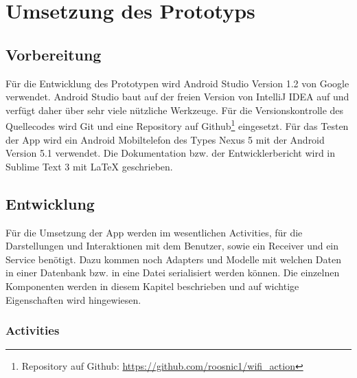 \chapter{Umsetzung des Prototyps}
\label{sec:umsetzung}

\section{Vorbereitung}

Für die Entwicklung des Prototypen wird Android Studio Version 1.2 von Google verwendet. Android Studio baut auf der freien Version von IntelliJ IDEA auf und verfügt daher über sehr viele nützliche Werkzeuge. Für die Versionskontrolle des Quellecodes wird Git und eine Repository auf Github\footnote{Repository auf Github: \url{https://github.com/roosnic1/wifi_action}} eingesetzt. Für das Testen der App wird ein Android Mobiltelefon des Types Nexus 5 mit der Android Version 5.1 verwendet. Die Dokumentation bzw. der Entwicklerbericht wird in Sublime Text 3 mit \LaTeX{} geschrieben.

\section{Entwicklung}
Für die Umsetzung der App werden im wesentlichen Activities, für die Darstellungen und Interaktionen mit dem Benutzer, sowie ein Receiver und ein Service benötigt. Dazu kommen noch Adapters und Modelle mit welchen Daten in einer Datenbank bzw. in eine Datei serialisiert werden können. Die einzelnen Komponenten werden in diesem Kapitel beschrieben und auf wichtige Eigenschaften wird hingewiesen.

\subsection{Activities}

